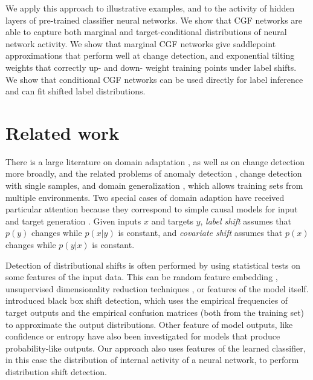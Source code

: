\documentclass{article}      %
\begin{document}
We apply this approach to illustrative examples, and to the activity of hidden layers of pre-trained classifier neural networks.
We show that CGF networks are able to capture both marginal and target-conditional distributions of neural network activity.
We show that marginal CGF networks give saddlepoint approximations that perform well at change detection, and exponential tilting weights that correctly up- and down- weight training points under label shifts.
We show that conditional CGF networks can be used directly for label inference and can fit shifted label distributions.


\section{Related work}

There is a large literature on domain adaptation \cite{kouw_introduction_2019}, as well as on change detection more broadly, and the related problems of anomaly detection \cite{pang_deep_2021}, change detection with single samples, and domain generalization \cite{gulrajani_search_2021}, which allows training sets from multiple environments.
Two special cases of domain adaption have received particular attention because they correspond to simple causal models for input and target generation \cite{scholkopf_causal_2012,zhang_domain_2013}.
Given inputs $x$ and targets $y$, \textit{label shift} assumes that $p(y)$ changes while $p(x|y)$ is constant, and \textit{covariate shift} assumes that $p(x)$ changes while $p(y|x)$ is constant.


Detection of distributional shifts is often performed by using statistical tests on some features of the input data.
This can be random feature embedding \cite{garg_unified_2020}, unsupervised dimensionality reduction techniques \cite{rabanser_failing_2019}, or features of the model itself.
\cite{lipton_detecting_2018} introduced black box shift detection, which uses the empirical frequencies of target outputs and the empirical confusion matrices (both from the training set) to approximate the output distributions.
Other feature of model outputs, like confidence \cite{hendrycks_baseline_2017} or entropy \cite{garg_leveraging_2022} have also been investigated for models that produce probability-like outputs.
Our approach also uses features of the learned classifier, in this case the distribution of internal activity of a neural network, to perform distribution shift detection.
\end{document}
